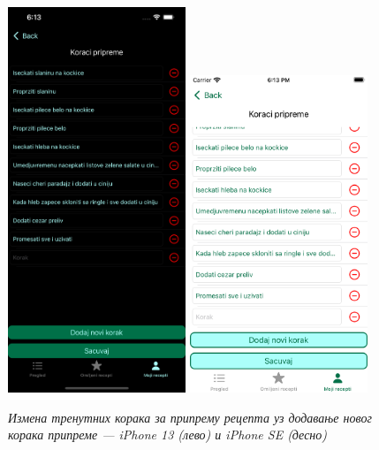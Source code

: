 \documentclass[12pt,oneside]{memoir}
\begin{document}
\begin{figure} [H]
    \centering
    \captionsetup{justification=centering}
    \includegraphics[width=0.475\textwidth]{images/simulators/view images/dark - steps2.png} 
    \hfill
    \includegraphics[width=0.475\textwidth]{images/simulators/view images/light - steps2.png} 
    \caption{\textit{Измена тренутних корака за припрему рецепта уз додавање новог корака припреме --- iPhone 13 (лево) и iPhone SE (десно)}}
    \label{slika:измена_корака_2_1}
\end{figure}
\end{document}
